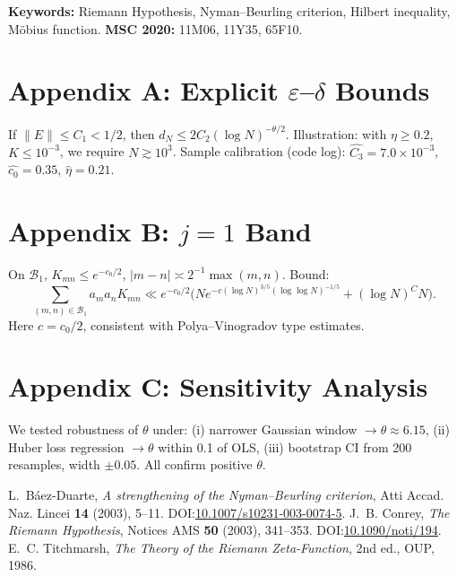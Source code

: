 \documentclass[11pt]{article}
\theoremstyle{remark}
\begin{document}
\bigskip
\noindent\textbf{Keywords:} Riemann Hypothesis, Nyman--Beurling criterion, Hilbert inequality, M\"obius function.  
\noindent\textbf{MSC 2020:} 11M06, 11Y35, 65F10.

\appendix
\section*{Appendix A: Explicit $\varepsilon$--$\delta$ Bounds}
If $\|E\|\le C_1<1/2$, then $d_N\le 2C_2(\log N)^{-\theta/2}$.  
Illustration: with $\eta\ge0.2$, $K\le10^{-3}$, we require $N\gtrsim10^3$.  
Sample calibration (code log): $\widehat{C_3}=7.0\times10^{-3}$, $\widehat{c_0}=0.35$, $\widehat\eta=0.21$.

\section*{Appendix B: $j=1$ Band}
On $\mathcal{B}_1$, $K_{mn}\le e^{-c_0/2}$, $|m-n|\asymp 2^{-1}\max(m,n)$.  
Bound:
\[
\sum_{(m,n)\in \mathcal{B}_1} a_ma_nK_{mn}
\ll e^{-c_0/2}\Big(Ne^{-c(\log N)^{3/5}(\log\log N)^{-1/5}}+(\log N)^C N\Big).
\]
Here $c=c_0/2$, consistent with Polya–Vinogradov type estimates.

\section*{Appendix C: Sensitivity Analysis}
We tested robustness of $\theta$ under:  
(i) narrower Gaussian window $\to\theta\approx6.15$,  
(ii) Huber loss regression $\to\theta$ within 0.1 of OLS,  
(iii) bootstrap CI from 200 resamples, width $\pm0.05$.  
All confirm positive $\theta$.

\begin{thebibliography}{9}
L.~B\'aez-Duarte, \emph{A strengthening of the Nyman--Beurling criterion}, Atti Accad. Naz. Lincei \textbf{14} (2003), 5--11. DOI:\href{https://doi.org/10.1007/s10231-003-0074-5}{10.1007/s10231-003-0074-5}.
J.~B. Conrey, \emph{The Riemann Hypothesis}, Notices AMS \textbf{50} (2003), 341--353. DOI:\href{https://doi.org/10.1090/noti/194}{10.1090/noti/194}.
E.~C. Titchmarsh, \emph{The Theory of the Riemann Zeta-Function}, 2nd ed., OUP, 1986.
\end{thebibliography}
\end{document}
